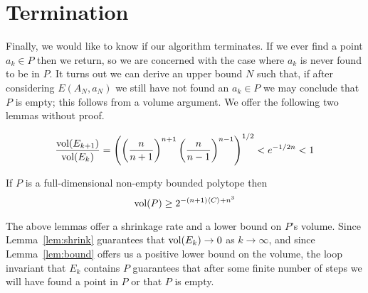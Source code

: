 \section{Termination}
Finally, we would like to know if our algorithm terminates. If we ever find a
point \(a_k \in P\) then we return, so we are concerned with the case where
\(a_k\) is never found to be in \(P\). It turns out we can derive an upper bound
\(N\) such that, if after considering \(E(A_N, a_N)\) we still have not found an
\(a_k \in P\) we may conclude that \(P\) is empty; this follows from a volume
argument. We offer the following two lemmas without proof.\\

\begin{lemma}\label{lem:shrink}
\[\frac{\textnormal{vol}(E_{k+1})}{\textnormal{vol}{(E_k)}} =
\left(\left(\frac{n}{n+1}\right)^{n+1}\left(\frac{n}{n-1}\right)^{n-1}\right)^{1/2}
< e^{-1/2n} < 1\]
\end{lemma}

\begin{lemma}\label{lem:bound}
If \(P\) is a full-dimensional non-empty bounded polytope then
\[\textnormal{vol}(P) \geq 2^{-(n+1)\langle {C} \rangle + n^3}\]
\end{lemma}

The above lemmas offer a shrinkage rate and a lower bound on \(P\)'s volume.
Since Lemma~\ref{lem:shrink} guarantees that \(\textnormal{vol}(E_k) \to 0\) as \(k \to
\infty\), and since Lemma~\ref{lem:bound} offers us a positive lower bound on
the volume, the loop invariant that \(E_k\) contains \(P\) guarantees that after
some finite number of steps we will have found a point in \(P\) or that \(P\)
is empty.

